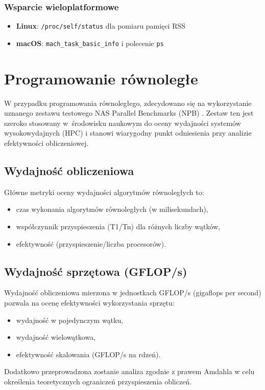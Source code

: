 \subsubsection{Wsparcie wieloplatformowe}
\begin{itemize}
    \item \textbf{Linux}: \texttt{/proc/self/status} dla pomiaru pamięci RSS
    \item \textbf{macOS}: \texttt{mach\_task\_basic\_info} i polecenie \texttt{ps}
\end{itemize}

\section{Programowanie równoległe}
W przypadku programowania równoległego, zdecydowano się na wykorzystanie uznanego zestawu testowego NAS Parallel Benchmarks (NPB) \cite{nasaParallelBenchmarks}. Zestaw ten jest szeroko stosowany w~środowisku naukowym do oceny wydajności systemów wysokowydajnych (HPC) i stanowi wiarygodny punkt odniesienia przy analizie efektywności obliczeniowej.
\subsection{Wydajność obliczeniowa}
Główne metryki oceny wydajności algorytmów równoległych to:
\begin{itemize}
\item czas wykonania algorytmów równoległych (w milisekundach),
\item współczynnik przyspieszenia (T1/Tn) dla różnych liczby wątków,
\item efektywność (przyspieszenie/liczba procesorów).
\end{itemize}

\subsection{Wydajność sprzętowa (GFLOP/s)}
Wydajność obliczeniowa mierzona w jednostkach GFLOP/s (gigaflops per second) pozwala na ocenę efektywności wykorzystania sprzętu:
\begin{itemize}
\item wydajność w pojedynczym wątku,
\item wydajność wielowątkowa,
\item efektywność skalowania (GFLOP/s na rdzeń).
\end{itemize}
Dodatkowo przeprowadzona zostanie analiza zgodnie z prawem Amdahla w celu określenia teoretycznych ograniczeń przyspieszenia obliczeń.


